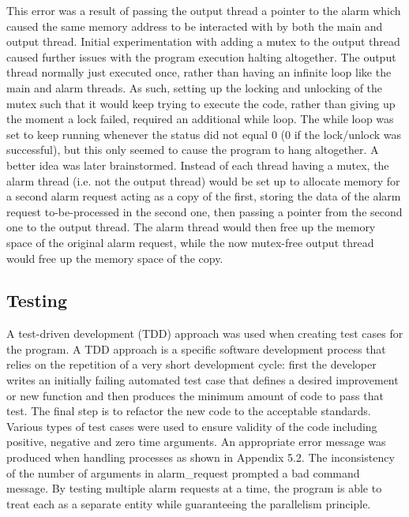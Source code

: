 \documentclass[11pt]{article}
\newcommand{\forceindent}{\leavevmode{\parindent=1em\indent}}
\begin{document}
 This error was a result of passing the output thread a pointer to the alarm which caused the same memory address to be interacted with by both the main and output thread. Initial experimentation with adding a mutex to the output thread caused further issues with the program execution halting altogether. The output thread normally just executed once, rather than having an infinite loop like the main and alarm threads. As such, setting up the locking and unlocking of the mutex such that it would keep trying to execute the code, rather than giving up the moment a lock failed, required an additional while loop. The while loop was set to keep running whenever the status did not equal 0 (0 if the lock/unlock was successful), but this only seemed to cause the program to hang altogether. A better idea was later brainstormed. Instead of each thread having a mutex, the alarm thread (i.e. not the output thread) would be set up to allocate memory for a second alarm request acting as a copy of the first, storing the data of the alarm request to-be-processed in the second one, then passing a pointer from the second one to the output thread. The alarm thread would then free up the memory space of the original alarm request, while the now mutex-free output thread would free up the memory space of the copy.
	
\subsection{Testing}

\forceindent A test-driven development (TDD) approach was used when creating test cases for the program. A TDD approach is a specific software development process that relies on the repetition of a very short development cycle: first the developer writes an initially failing automated test case that defines a desired improvement or new function and then produces the minimum amount of code to pass that test. The final step is to refactor the new code to the acceptable standards.\\

Various types of test cases were used to ensure validity of the code including positive, negative and zero time arguments. An appropriate error message was produced when handling processes as shown in Appendix 5.2. The inconsistency of the number of arguments in alarm\_request prompted a bad command message. By testing multiple alarm requests at a time, the program is able to treat each as a separate entity while guaranteeing the parallelism principle. 
\end{document}
